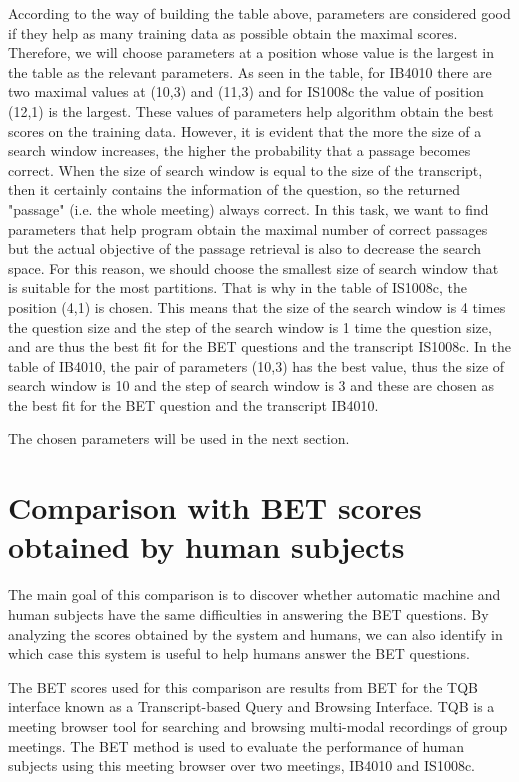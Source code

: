 According to the way of building the table above, parameters are considered good if they help as many training data as possible obtain the maximal scores. Therefore, we will choose parameters at a position whose value is the largest in the table as the relevant parameters. As seen in the table, for IB4010 there are two maximal values at (10,3) and (11,3) and for IS1008c the value of position (12,1) is the largest. These values of parameters help algorithm obtain the best scores on the training data. However, it is evident that the more the size of a search window increases, the higher the probability that a passage becomes correct. When the size of search window is equal to the size of the transcript, then it certainly contains the information of the question, so the returned "passage" (i.e. the whole meeting) always correct. In this task, we want to find parameters that help program obtain the maximal number of correct passages but the actual objective of the passage retrieval is also to decrease the search space. For this reason, we should choose the smallest size of search window that is suitable for the most partitions. That is why in the table of IS1008c, the position (4,1) is chosen. This means that the size of the search window is 4 times the question size and the step of the search window is 1 time the question size, and are thus the best fit for the BET questions and the transcript IS1008c. 
In the table of IB4010, the pair of parameters (10,3) has the best value, thus the size of search window is 10 and the step of search window is 3 and these are chosen as the best fit for the BET question and the transcript IB4010.

The chosen parameters will be used in the next section.




\section{Comparison with BET scores obtained by human subjects}

 The main goal of this comparison is to discover whether automatic machine and human subjects have the same difficulties in answering the BET questions. By analyzing the scores obtained by the system and humans, we can also identify in which case this system is useful to help humans answer the BET questions. 

The BET scores used for this comparison are results from BET for the TQB interface \cite{popescubelis2007otm} known as a Transcript-based Query and Browsing Interface. TQB is a meeting browser tool for searching and browsing multi-modal recordings of group meetings. The BET method is used to evaluate the performance of human subjects using this meeting browser over two meetings, IB4010 and IS1008c.

